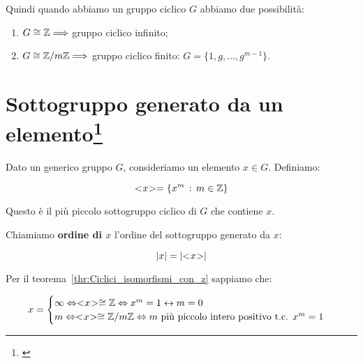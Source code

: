 Quindi quando abbiamo un gruppo ciclico $G$ abbiamo due possibilità:

\begin{enumerate}
	\item $G \cong \mathbb{Z} \Longrightarrow$ gruppo ciclico infinito;
	\item $G \cong \mathbb{Z}/m\mathbb{Z} \Longrightarrow$ gruppo ciclico finito: $G = \{1, g, \dots, g^{m-1}\}$.
\end{enumerate}

\section[Sottogruppo generato da un elemento]{Sottogruppo generato da un elemento\footnote{\cite[1 ottobre 2021]{lucchini}}}

Dato un generico gruppo $G$, consideriamo un elemento $x \in G$. Definiamo:

\begin{equation}
	< \negmedspace x \negmedspace > = \{x^m \,:\, m \in \mathbb{Z}\}
\end{equation}

Questo è il più piccolo sottogruppo ciclico di $G$ che contiene $x$.

Chiamiamo \textbf{ordine di $x$} l'ordine del sottogruppo generato da $x$:

\begin{equation}
	\lvert x \rvert = \lvert < \negmedspace x \negmedspace > \rvert
\end{equation}

Per il teorema~\ref{thr:Ciclici_isomorfismi_con_z} sappiamo che:

\begin{equation}
	x = 
	\begin{cases}
		\infty \Leftrightarrow < \negmedspace x \negmedspace > \cong \mathbb{Z} \Leftrightarrow x^m = 1 \leftrightarrow m = 0 \\
		m \Leftrightarrow < \negmedspace x \negmedspace > \cong \mathbb{Z}/m\mathbb{Z} \Leftrightarrow m \text{ più piccolo intero positivo t.c. } x^m = 1 
	\end{cases}
\end{equation}

